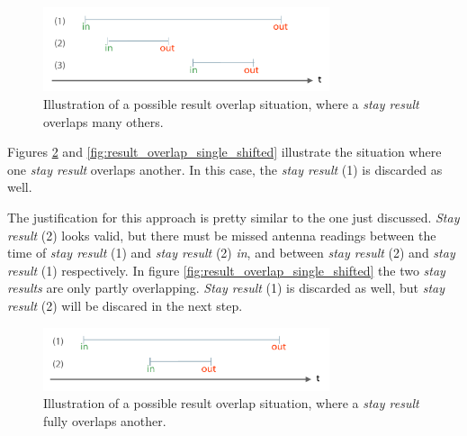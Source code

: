 \begin{figure}[htpb]
\begin{center}
  \includegraphics[width=0.75\textwidth]{assets/pdf/result_overlaps_schema.pdf}
  \caption[Multiple result overlap illustration]{Illustration of a possible result overlap situation, where a \textit{stay result} overlaps many others.}
  \label{fig:result_overlap}
\end{center}
\end{figure}

Figures \ref{fig:result_overlap_single} and \ref{fig:result_overlap_single_shifted} illustrate the situation where one \textit{stay result} overlaps another. In this case, the \textit{stay result} (1) is discarded as well.

The justification for this approach is pretty similar to the one just discussed. \textit{Stay result} (2) looks valid, but there must be missed antenna readings between the time of \textit{stay result} (1) and \textit{stay result} (2) \textit{in}, and between \textit{stay result} (2) and \textit{stay result} (1) respectively. In figure \ref{fig:result_overlap_single_shifted} the two \textit{stay results} are only partly overlapping. \textit{Stay result} (1) is discarded as well, but \textit{stay result} (2) will be discared in the next step.      

\begin{figure}[htpb]
\begin{center}
  \includegraphics[width=0.75\textwidth]{assets/pdf/result_overlaps_single_schema.pdf}
  \caption[Single result fully overlap illustration]{Illustration of a possible result overlap situation, where a \textit{stay result} fully overlaps another.}
  \label{fig:result_overlap_single}
\end{center}
\end{figure} 

